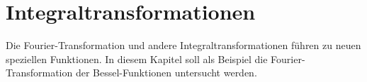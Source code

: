 %
%
%
\chapter{Integraltransformationen
\label{buch:chapter:fourier}}
\rhead{}
Die Fourier-Transformation und andere Integraltransformationen
führen zu neuen speziellen Funktionen.
In diesem Kapitel soll als Beispiel die Fourier-Transformation
der Bessel-Funktionen untersucht werden.







